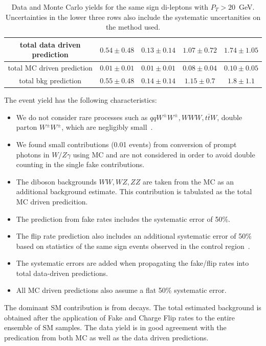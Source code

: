 \begin{table}[htb]
\begin{center}
\begin{tabular}{|c|c|c|c|c|}
total data driven prediction & $0.54\pm 0.48$ & $0.13\pm 0.14$ & $1.07\pm 0.72$ & $1.74\pm 1.05$ \\ \hline
total MC driven prediction & $0.01\pm 0.01$ & $0.01\pm 0.01$ & $0.08\pm 0.04$ & $0.10\pm 0.05$ \\\hline\hline
total bkg prediction & $0.55\pm 0.48$ & $0.14\pm 0.14$ & $1.15\pm 0.7$ & $1.8\pm 1.1$ \\\hline
\end{tabular}
\caption{Data and Monte Carlo yields for the same sign di-leptons with $P_T >20$\ GeV. 
Uncertainties in the lower three rows also include the systematic uncertanities on the method used.\label{tab:ssyields} }
\end{center}
\end{table}

The event yield has the following characteristics:

\begin{itemize}
\item We do not consider rare processes such as $qqW^\pm W^\pm, WWW, t\bar{t}W$, double parton $W^\pm W^\pm$, which are 
negligibly small~\cite{ssnote1}.
\item We found small contributions (0.01 events) from conversion of prompt photons in $W/Z\gamma$ using MC and are
not considered in order to avoid double counting in the single fake contributions.
\item The diboson backgrounds $WW, WZ, ZZ$ are taken from the MC as an additional background estimate. This contribution
is tabulated as the total MC driven predicition.
\item The prediction from fake rates includes the systematic error of 50\%. 
\item The flip rate prediction also includes an additional systematic error of 50\% based on statistics of the same
sign events observed in the control region~\cite{ssnote1}.
\item The systematic errors are added when propagating the fake/flip rates into total data-driven predictions.
\item All MC driven predictions also assume a flat 50\% systematic error.
\end{itemize}

The dominant SM contribution is from \ttbar decays. The total estimated background 
is obtained after the application of Fake and Charge Flip rates to the entire ensemble
of SM samples. The data yield is in good agreement with the predication from both MC as 
well as the data driven predictions. 

